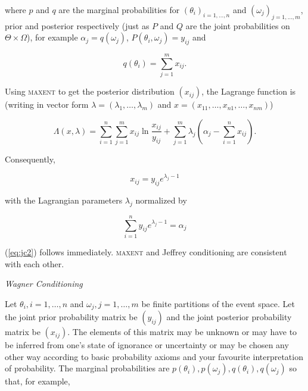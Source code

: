 \documentclass[11pt]{article}
\begin{document}
where $p$ and $q$ are the marginal probabilities for
$(\theta_{i})_{i=1,\ldots,n}$ and $(\omega_{j})_{j=1,\ldots,m}$, prior
and posterior respectively (just as $P$ and $Q$ are the joint
probabilities on $\Theta\times\Omega$), for example
$\alpha_{j}=q(\omega_{j})$, $P(\theta_{i},\omega_{j})=y_{ij}$ and

\begin{equation}
  \label{eq:jc3}
  q(\theta_{i})=\sum_{j=1}^{m}x_{ij}.
\end{equation}

Using \textsc{maxent} to get the posterior distribution $(x_{ij})$,
the Lagrange function is (writing in vector form
$\lambda=(\lambda_{1},\ldots,\lambda_{m})$ and
$x=(x_{11},\ldots,x_{n1},\ldots,x_{nm})$)

\begin{equation}
  \label{eq:jclag}
  \Lambda(x,\lambda)=\sum_{i=1}^{n}\sum_{j=1}^{m}x_{ij}\ln\frac{x_{ij}}{y_{ij}}+\sum_{j=1}^{m}\lambda_{j}\left(\alpha_{j}-\sum_{i=1}^{n}x_{ij}\right).
\end{equation}

Consequently,

\begin{equation}
  \label{eq:jc4}
  x_{ij}=y_{ij}e^{\lambda_{j}-1}
\end{equation}

with the Lagrangian parameters $\lambda_{j}$ normalized by

\begin{equation}
  \label{eq:jc5}
  \sum_{i=1}^{n}y_{ij}e^{\lambda_{j}-1}=\alpha_{j}
\end{equation}

(\ref{eq:jc2}) follows immediately. \textsc{maxent} and Jeffrey
conditioning are consistent with each other.

\medskip

{\noindent}\emph{Wagner Conditioning}

\medskip

{\noindent}Let $\theta_{i},i=1,\ldots,n$ and
$\omega_{j},j=1,\ldots,m$ be finite partitions of the event space. Let
the joint prior probability matrix be $(y_{ij})$ and the joint
posterior probability matrix be $(x_{ij})$. The elements of this
matrix may be unknown or may have to be inferred from one's state of
ignorance or uncertainty or may be chosen any other way according to
basic probability axioms and your favourite interpretation of
probability. The marginal probabilities are
$p(\theta_{i}),p(\omega_{j}),q(\theta_{i}),q(\omega_{j})$ so that, for
example,
\end{document}
